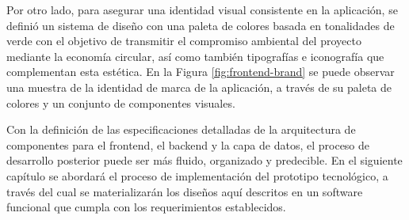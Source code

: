 Por otro lado, para asegurar una identidad visual consistente en la aplicación, se definió un sistema de diseño con una paleta de colores basada en tonalidades de verde con el objetivo de transmitir el compromiso ambiental del proyecto mediante la economía circular, así como también tipografías e iconografía que complementan esta estética. En la Figura \ref{fig:frontend-brand} se puede observar una muestra de la identidad de marca de la aplicación, a través de su paleta de colores y un conjunto de componentes visuales.

Con la definición de las especificaciones detalladas de la arquitectura de componentes para el frontend, el backend y la capa de datos, el proceso de desarrollo posterior puede ser más fluido, organizado y predecible. En el siguiente capítulo se abordará el proceso de implementación del prototipo tecnológico, a través del cual se materializarán los diseños aquí descritos en un software funcional que cumpla con los requerimientos establecidos.
